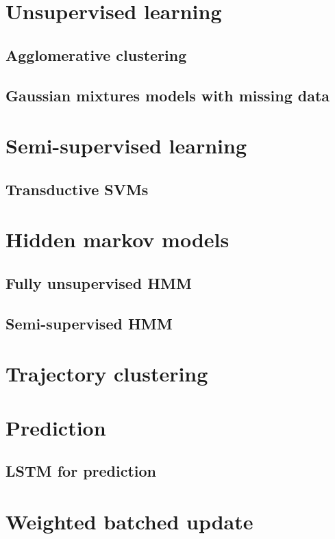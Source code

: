 \documentclass[a4paper, 11pt]{article}
\begin{document}
\section{Unsupervised learning}

\subsection{Agglomerative clustering}

\subsection{Gaussian mixtures models with missing data}

\section{Semi-supervised learning}

\subsection{Transductive SVMs}

\section{Hidden markov models}

\subsection{Fully unsupervised HMM}

\subsection{Semi-supervised HMM}

\section{Trajectory clustering}

\section{Prediction}

\subsection{LSTM for prediction}


\section{Weighted batched update}
\end{document}
